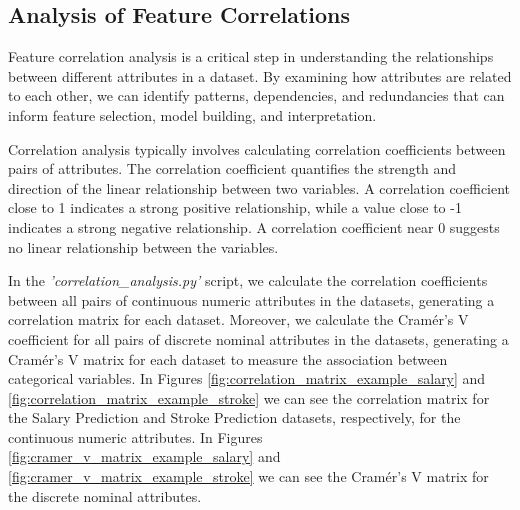 \documentclass[runningheads]{paper}
\begin{document}
\subsection{Analysis of Feature Correlations}
Feature correlation analysis is a critical step in understanding the relationships
between different attributes in a dataset. By examining how attributes are related
to each other, we can identify patterns, dependencies, and redundancies that can
inform feature selection, model building, and interpretation.

Correlation analysis typically involves calculating correlation coefficients
between pairs of attributes. The correlation coefficient quantifies the strength
and direction of the linear relationship between two variables. A correlation
coefficient close to 1 indicates a strong positive relationship, while a value
close to -1 indicates a strong negative relationship. A correlation coefficient
near 0 suggests no linear relationship between the variables.

In the \textit{'correlation\_analysis.py'} script, we calculate the correlation
coefficients between all pairs of continuous numeric attributes in the datasets,
generating a correlation matrix for each dataset. Moreover, we calculate the 
Cramér's V coefficient for all pairs of discrete nominal attributes in the datasets,
generating a Cramér's V matrix for each dataset to measure the association between
categorical variables. In Figures \ref{fig:correlation_matrix_example_salary} and
\ref{fig:correlation_matrix_example_stroke} we can see the correlation matrix for
the Salary Prediction and Stroke Prediction datasets, respectively, for the continuous
numeric attributes. In Figures \ref{fig:cramer_v_matrix_example_salary} and
\ref{fig:cramer_v_matrix_example_stroke} we can see the Cramér's V matrix for
the discrete nominal attributes.
\end{document}
